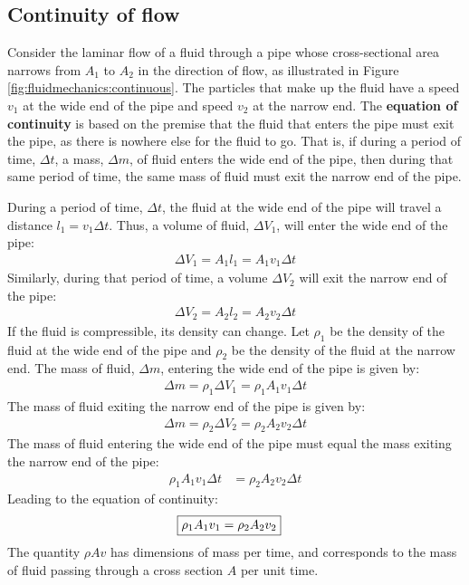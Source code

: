 {{\subsection{Continuity of flow}
\label{sec:fluidmechanics:continuity}
Consider the laminar flow of a fluid through a pipe whose cross-sectional area narrows from $A_1$ to $A_2$ in the direction of flow, as illustrated in Figure \ref{fig:fluidmechanics:continuous}.
The particles that make up the fluid have a speed $v_1$ at the wide end of the pipe and speed $v_2$ at the narrow end. The \textbf{equation of continuity} is based on the premise that the fluid that enters the pipe must exit the pipe, as there is nowhere else for the fluid to go. That is, if during a period of time, $\Delta t$, a mass, $\Delta m$, of fluid enters the wide end of the pipe, then during that same period of time, the same mass of fluid must exit the narrow end of the pipe. 

During a period of time, $\Delta t$, the fluid at the wide end of the pipe will travel a distance $l_1=v_1\Delta t$. Thus, a volume of fluid, $\Delta V_1$, will enter the wide end of the pipe:
\begin{align*}
\Delta V_1 = A_1 l_1 = A_1 v_1 \Delta t
\end{align*}
Similarly, during that period of time, a volume $\Delta V_2$ will exit the narrow end of the pipe:
\begin{align*}
\Delta V_2 = A_2 l_2 = A_2 v_2 \Delta t
\end{align*}
If the fluid is compressible, its density can change. Let $\rho_1$ be the density of the fluid at the wide end of the pipe and $\rho_2$ be the density of the fluid at the narrow end. The mass of fluid, $\Delta m$, entering the wide end of the pipe is given by:
\begin{align*}
\Delta m = \rho_1 \Delta V_1= \rho_1 A_1 v_1 \Delta t
\end{align*}
The mass of fluid exiting the narrow end of the pipe is given by:
\begin{align*}
\Delta m = \rho_2 \Delta V_2= \rho_2 A_2 v_2 \Delta t
\end{align*}
The mass of fluid entering the wide end of the pipe must equal the mass exiting the narrow end of the pipe:
\begin{align*}
\rho_1 A_1 v_1 \Delta t &= \rho_2 A_2 v_2 \Delta t
\end{align*}
Leading to the equation of continuity:
\begin{align}
\Aboxed{\rho_1 A_1 v_1 &= \rho_2 A_2 v_2}
\end{align}
The quantity $\rho A v$ has dimensions of mass per time, and corresponds to the mass of fluid passing through a cross section $A$ per unit time.

}}
